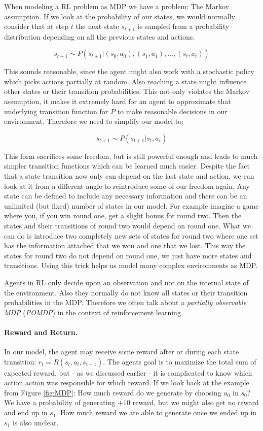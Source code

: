 When modeling a RL problem as MDP we have a problem: The Markov assumption. If we look at the probability of our states, we would normally consider that at step $t$ the next state $s_{t+1}$ is sampled from a probability distribution depending on all the previous states and actions.

\[s_{t+1} \sim P\left(s_{t+1}|(s_0, a_0), (s_1, a_1), \dots, (s_t, a_t)\right)\]

 This sounds reasonable, since the agent might also work with a stochastic policy which picks actions partially at random. Also reaching a state might influence other states or their transition probabilities. This not only violates the Markov assumption, it makes it extremely hard for an agent to approximate that underlying transition function for $P$ to make reasonable decisions in our environment. Therefore we need to simplify our model to:  

 \[s_{t+1} \sim P(s_{t+1}|s_t, a_t)\]

This form sacrifices some freedom, but is still powerful enough and leads to much simpler transition functions which can be learned much easier. Despite the fact that a state transition now only can depend on the last state and action, we can look at it from a different angle to reintroduce some of our freedom again. Any state can be defined to include any necessary information and there can be an unlimited (but fixed) number of states in our model. For example imagine a game where you, if you win round one, get a slight bonus for round two. Then the states and their transitions of round two would depend on round one. What we can do is introduce two completely new sets of states for round two where one set has the information attached that we won and one that we lost. This way the states for round two do not depend on round one, we just have more states and transitions. Using this trick helps us model many complex environments as MDP.

Agents in RL only decide upon an observation and not on the internal state of the environment. Also they normally do not know all states or their transition probabilities in the MDP. Therefore we often talk about a \textit{partially observable MDP} (\textit{POMDP}) in the context of reinforcement learning.

\paragraph{Reward and Return.}
In our model, the agent may receive some reward after or during each state transition: $r_t = R(s_t, a_t, s_{t+1})$. The agents goal is to maximize the total sum of expected reward, but - as we discussed earlier - it is complicated to know which action action was responsible for which reward. If we look back at the example from Figure \ref{fig:MDP}: How much reward do we generate by choosing $a_0$ in $s_0$? We have a probability of generating $+10$ reward, but we might also get no reward and end up in $s_1$. How much reward we are able to generate once we ended up in $s_1$ is also unclear.


